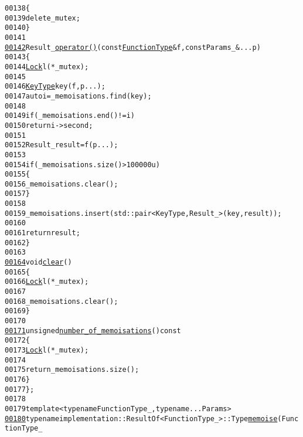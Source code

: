 \begin{footnotesize}
\begin{alltt}
00138             \{
00139                 \textcolor{keyword}{delete} \_mutex;
00140             \}
00141 
\hypertarget{memoise_8hh_source_l00142}{}\hyperlink{classeos_1_1Memoiser_a3850676222d9601549fc69e3fa76e959}{00142}             Result\_ \hyperlink{classeos_1_1Memoiser_a3850676222d9601549fc69e3fa76e959}{operator() }(\textcolor{keyword}{const} \hyperlink{classeos_1_1Memoiser_a402c1728aaaf3737722674ebf9cb0644}{FunctionType} & f, \textcolor{keyword}{const} Params\_ & ... p)
00143             \{
00144                 \hyperlink{classeos_1_1Lock}{Lock} l(*\_mutex);
00145 
00146                 \hyperlink{classeos_1_1Memoiser_aa17152256a324a1d43739567968c1736}{KeyType} key(f, p ...);
00147                 \textcolor{keyword}{auto} i = \_memoisations.find(key);
00148 
00149                 \textcolor{keywordflow}{if} (\_memoisations.end() != i)
00150                     \textcolor{keywordflow}{return} i->second;
00151 
00152                 Result\_ result = f(p ...);
00153 
00154                 \textcolor{keywordflow}{if} (\_memoisations.size() > 100000u)
00155                 \{
00156                     \_memoisations.clear();
00157                 \}
00158 
00159                 \_memoisations.insert(std::pair<KeyType, Result\_>(key, result));
00160 
00161                 \textcolor{keywordflow}{return} result;
00162             \}
00163 
\hypertarget{memoise_8hh_source_l00164}{}\hyperlink{classeos_1_1Memoiser_a353f1f69dd0ff3308fb585301f73b168}{00164}             \textcolor{keywordtype}{void} \hyperlink{classeos_1_1Memoiser_a353f1f69dd0ff3308fb585301f73b168}{clear}()
00165             \{
00166                 \hyperlink{classeos_1_1Lock}{Lock} l(*\_mutex);
00167 
00168                 \_memoisations.clear();
00169             \}
00170 
\hypertarget{memoise_8hh_source_l00171}{}\hyperlink{classeos_1_1Memoiser_ab3f142b5355fa1f2d8ee483aa4ad8982}{00171}             \textcolor{keywordtype}{unsigned} \hyperlink{classeos_1_1Memoiser_ab3f142b5355fa1f2d8ee483aa4ad8982}{number_of_memoisations}()\textcolor{keyword}{ const}
00172 \textcolor{keyword}{            }\{
00173                 \hyperlink{classeos_1_1Lock}{Lock} l(*\_mutex);
00174 
00175                 \textcolor{keywordflow}{return} \_memoisations.size();
00176             \}
00177     \};
00178 
00179     \textcolor{keyword}{template} <\textcolor{keyword}{typename} FunctionType\_, \textcolor{keyword}{typename} ... Params>
\hypertarget{memoise_8hh_source_l00180}{}\hyperlink{namespaceeos_a145cd9427e62a28f1144614e2b9a3d7d}{00180}     \textcolor{keyword}{typename} implementation::ResultOf<FunctionType\_>::Type \hyperlink{namespaceeos_a145cd9427e62a28f1144614e2b9a3d7d}{memoise}(FunctionType\_ 

\end{alltt}
\end{footnotesize}
